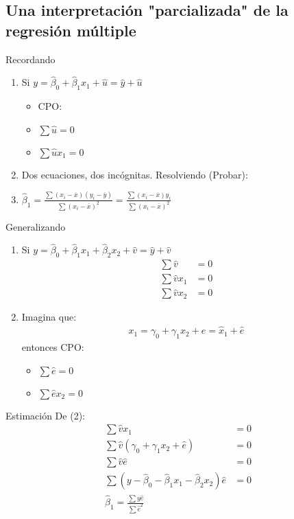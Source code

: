 \subsection{Una interpretación "parcializada" de la regresión múltiple}
\begin{frame}{Recordando}
	\begin{enumerate}
		\item Si $y=\hat\beta_0+\hat\beta_1 x_1+\hat u=\hat y+\hat u$
		\begin{itemize}
			\item CPO:
			\item $\sum \hat u=0$
			\item $\sum \hat u x_1=0$
		\end{itemize}
		\item Dos ecuaciones, dos incógnitas. Resolviendo (Probar):
		\item $\hat{\beta}_1=\frac{\sum(x_i-\overline{x})(y_i-\overline y)}{\sum(x_i-\overline x)^2}=\frac{\sum(x_i-\overline x)y_i}{\sum(x_i-\overline x)^2}$
	\end{enumerate}
\end{frame}
\begin{frame}{Generalizando}
	\begin{enumerate}
		\item Si $y=\hat\beta_0+\hat\beta_1 x_1+\hat\beta_2 x_2+\hat v=\hat y+\hat v$
		\begin{align}
			\sum \hat v & = 0 \\
			\sum \hat v x_1 & = 0 \\
			\sum \hat v x_2 & = 0
		\end{align}
		\item Imagina que:
		\begin{align}
			x_1 = \gamma_0+\gamma_1 x_2+\hat e=\hat{x}_1+\hat e
		\end{align}
		entonces CPO:
		\begin{itemize}
			\item $\sum \hat e=0$
			\item $\sum \hat e x_2=0$
		\end{itemize}
	\end{enumerate}
\end{frame}
\begin{frame}{Estimación} De (2):
	\begin{align}
		\sum\hat v x_1 & = 0 \\
		\sum\hat v (\gamma_0+\gamma_1 x_2+\hat e) & = 0 \\
		\sum\hat v \hat e & = 0 \\
		\sum (y-\hat\beta_0-\hat\beta_1 x_1-\hat\beta_2 x_2) \hat e & = 0\\
		\hat{\beta}_1=\frac{\sum y \hat e}{\sum \hat{e}^2}
	\end{align}
\end{frame}


